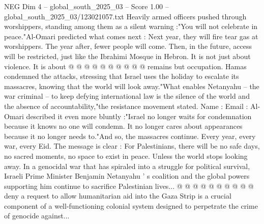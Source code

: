 \begin{textsample}{NEG Dim 4 – global\_south\_2025\_03 – Score 1.00 – global\_south\_2025\_03/123021057.txt}
Heavily armed officers pushed through worshippers, standing among them as a silent warning :"You will not celebrate in peace."Al-Omari predicted what comes next : Next year, they will fire tear gas at worshippers.
The year after, fewer people will come.
Then, in the future, access will be restricted, just like the Ibrahimi Mosque in Hebron.
It is not just about violence.
It is about @ @ @ @ @ @ @ @ @ @ remains but occupation.
Hamas condemned the attacks, stressing that Israel uses the holiday to escalate its massacres, knowing that the world will look away."What enables Netanyahu -- the war criminal -- to keep defying international law is the silence of the world and the absence of accountability,"the resistance movement stated.
Name : Email : Al-Omari described it even more bluntly :"Israel no longer waits for condemnation because it knows no one will condemn.
It no longer cares about appearances because it no longer needs to."And so, the massacres continue.
Every year, every war, every Eid.
The message is clear : For Palestinians, there will be no safe days, no sacred moments, no space to exist in peace.
Unless the world stops looking away.
In a genocidal war that has spiraled into a struggle for political survival, Israeli Prime Minister Benjamin Netanyahu ' s coalition and the global powers supporting him continue to sacrifice Palestinian lives... @ @ @ @ @ @ @ @ @ @ deny a request to allow humanitarian aid into the Gaza Strip is a crucial component of a well-functioning colonial system designed to perpetrate the crime of genocide against...

\end{textsample}
